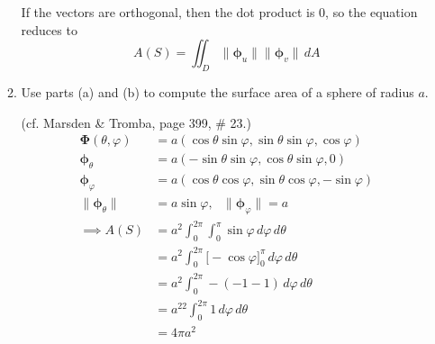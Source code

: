 \documentclass{article}
\newcommand{\norm}[1]{\| #1 \|}
\begin{document}
\begin{enumerate}
\begin{enumerate}
        If the vectors are orthogonal, then the dot product is 0, so the equation reduces to 
        \[ A(S) = \iint_D \norm{\boldsymbol \phi_u} \norm{\boldsymbol \phi_v}\, dA \]
        \item Use parts (a) and (b) to compute the surface area of a sphere of radius $a$.

        (cf. Marsden \& Tromba, page 399, \# 23.)
        \begin{align*}
            \boldsymbol \Phi (\theta, \varphi) &= a(\cos \theta \sin \varphi, \sin \theta \sin \varphi, \cos \varphi) \\
            \boldsymbol \phi_\theta &= a(- \sin \theta \sin \varphi, \cos \theta \sin \varphi, 0) \\
            \boldsymbol \phi_\varphi &= a( \cos \theta \cos \varphi, \sin \theta \cos \varphi, -\sin \varphi) \\
            \norm{\boldsymbol \phi_\theta} &= a\sin \varphi, \: \: \: \norm{\boldsymbol \phi_\varphi} = a \\
            \implies A(S) &= a^2\int_0^{2\pi}\int_0^\pi \sin \varphi \, d\varphi \, d\theta \\
            &= a^2\int_0^{2\pi}\Big[- \cos \varphi \Big]_0^{\pi} \, d\varphi \, d\theta \\
            &= a^2\int_0^{2\pi}- (-1 - 1) \, d\varphi \, d\theta \\
            &= a^22\int_0^{2\pi}1 \, d\varphi \, d\theta \\
            &= 4\pi a^2\\
        \end{align*} 




\end{enumerate}
\end{enumerate}
\end{document}
